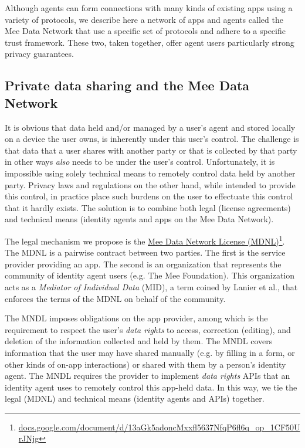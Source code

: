 \documentclass[11pt, oneside]{article}   	%
\newcommand{\hyperfootnote}[1][]{\def\ArgI{{#1}}\hyperfootnoteRelay}
\newcommand\hyperfootnoteRelay[2][]{\href{#1#2}{\ArgI}\footnote{\href{#1#2}{#2}}}
\begin{document}
Although agents can form connections with many kinds of existing apps using a variety of protocols, we describe here a network of apps and agents called the Mee Data Network that use a specific set of protocols and adhere to a specific trust framework. These two, taken together, offer agent users particularly strong privacy guarantees.

\subsection{Private data sharing and the Mee Data Network}

It is obvious that data held and/or managed by a user's agent and stored locally on a device the user owns, is inherently under this user's control. The challenge is that data that a user shares with another party or that is collected by that party in other ways \emph{also} needs to be under the user's control. Unfortunately, it is impossible using solely technical means to remotely control data held by another party. Privacy laws and regulations on the other hand, while intended to provide this control, in practice place such burdens on the user to effectuate this control that it hardly exists. The solution is to combine both legal (license agreements) and technical means (identity agents and apps on the Mee Data Network). 

The legal mechanism we propose is the \hyperfootnote[Mee Data Network License (MDNL)][https://]{docs.google.com/document/d/13aGk5adoncMxxfl5637NfqP6fl6q\_op\_1CF50UrJNjg}. The MDNL is a pairwise contract between two parties. The first is the service provider providing an app. The second is an organization that represents the community of identity agent users (e.g. The Mee Foundation). This organization acts as a \emph{Mediator of Individual Data} (MID), a term coined by Lanier et al.\cite{Lanier2018}, that enforces the terms of the MDNL on behalf of the community. 

The MNDL imposes obligations on the app provider, among which is the requirement to respect the user's \emph{data rights} to access, correction (editing), and deletion of the information collected and held by them. The MNDL covers information that the user may have shared manually (e.g. by filling in a form, or other kinds of on-app interactions) or shared with them by a person's identity agent. The MNDL requires the provider to implement \emph{data rights} APIs that an identity agent uses to remotely control this app-held data. In this way, we tie the legal (MDNL) and technical means (identity agents and APIs) together.
\end{document}
